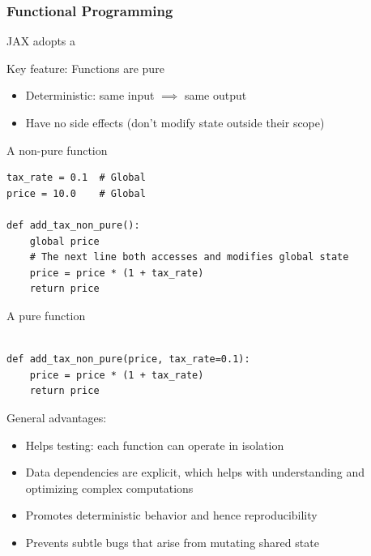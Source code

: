 \begin{frame}
    \frametitle{Functional Programming}
    
    JAX adopts a 

    \vspace{0.5em}
    \vspace{0.5em}
    \vspace{0.5em}
    \vspace{0.5em}
    Key feature: Functions are pure

    \begin{itemize}
        \item Deterministic: same input $\implies$ same output 
        \item Have no side effects (don't modify state outside their scope)
    \end{itemize}

\end{frame}


\begin{frame}[fragile]

    A non-pure function

    \begin{verbatim}
tax_rate = 0.1  # Global 
price = 10.0    # Global

def add_tax_non_pure():
    global price                
    # The next line both accesses and modifies global state
    price = price * (1 + tax_rate)    
    return price 
    \end{verbatim}
    
\end{frame}


\begin{frame}[fragile]

    A pure function

    \begin{verbatim}

def add_tax_non_pure(price, tax_rate=0.1):
    price = price * (1 + tax_rate)    
    return price 
    \end{verbatim}
    
\end{frame}


\begin{frame}

    General advantages:

    \begin{itemize}
        \item Helps testing: each function can operate in isolation
        \item Data dependencies are explicit, which helps with understanding and optimizing complex computations 
        \item Promotes deterministic behavior and hence reproducibility
        \item Prevents subtle bugs that arise from mutating shared state
    \end{itemize}

\end{frame}



